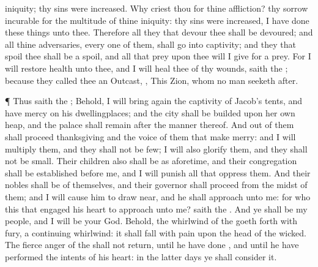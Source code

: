 {iniquity;
{} thy
sins were
increased.
Why
criest thou for thine
affliction? thy
sorrow
{}
incurable for the
multitude of thine
iniquity:
{} thy
sins were
increased, I have
done these things unto thee.
Therefore all they that
devour thee shall be
devoured; and all thine
adversaries, every one of them, shall
go into
captivity; and they that
spoil thee shall be a
spoil, and all that
prey upon thee will I
give for a
prey.
For I will
restore
health unto thee, and I will
heal thee of thy
wounds,
saith the
{}; because they
called thee an
Outcast,
{}, This
{}
Zion, whom no man seeketh
after.
\par }{\PP {}¶ Thus
saith the
{}; Behold, I will bring
again the
captivity of
Jacob’s
tents, and have
mercy on his
dwellingplaces; and the
city shall be
builded upon her own
heap, and the
palace shall
remain after the
manner thereof.
And out of them shall
proceed
thanksgiving and the
voice of them that make
merry: and I will
multiply them, and they shall not be
few; I will also
glorify them, and they shall not be
small.
Their
children also shall be as
aforetime, and their
congregation shall be
established
before me, and I will
punish all that
oppress them.
And their
nobles shall be of themselves, and their
governor shall
proceed from the
midst of them; and I will cause him to draw
near, and he shall
approach unto me: for who
{} this that
engaged his
heart to
approach unto me?
saith the
{}.
And ye shall be my
people, and I will be your
God.
Behold, the
whirlwind of the
{} goeth
forth with
fury, a
continuing
whirlwind: it shall fall with
pain upon the
head of the
wicked.
The
fierce
anger of the
{} shall not
return, until he have
done
{}, and until he have
performed the
intents of his
heart: in the
latter
days ye shall
consider it.

}
